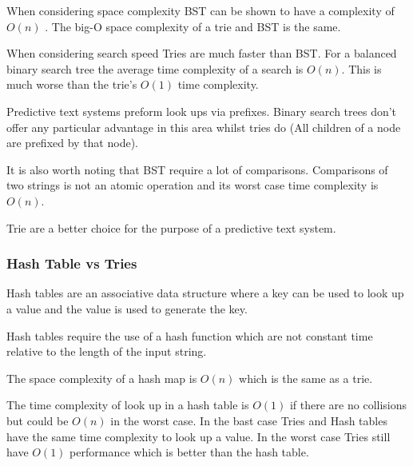\documentclass[10pt]{article} %
\begin{document}
			    When considering space complexity BST can be shown to have a complexity of \begin{math}O(n)\end{math} \cite{book:BST:complexity}. 
			    The big-O space complexity of a trie and BST is the same.
			    
			    When considering search speed Tries are much faster than BST. For a balanced binary search tree the average time complexity of a search is \begin{math} O(n) \end{math}. This is much worse than the trie's \begin{math} O(1) \end{math} time complexity.
			    
			    Predictive text systems preform look ups via prefixes. Binary search trees don't offer any particular advantage in this area whilst tries do (All children of a node are prefixed by that node).
			    
			    It is also worth noting that BST require a lot of comparisons. Comparisons of two strings is not an atomic operation and its worst case time complexity is \begin{math}O(n)\end{math}.
			    
			    Trie are a better choice for the purpose of a predictive text system. 
			    
			\subsubsection{Hash Table vs Tries}
			    Hash tables are an associative data structure where a key can be used to look up a value and the value is used to generate the key.
			    
			    Hash tables require the use of a hash function which are not constant time relative to the length of the input string.
			    
			    The space complexity of a hash map is \begin{math} O(n) \end{math} which is the same as a trie.
			    
			    The time complexity of look up in a hash table is \begin{math} O(1) \end{math} if there are no collisions but could be \begin{math} O(n) \end{math} in the worst case. In the bast case Tries and Hash tables have the same time complexity to look up a value. In the worst case Tries still have \begin{math} O(1) \end{math} performance which is better than the hash table.
			    
\end{document}

